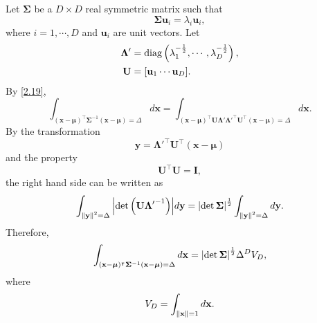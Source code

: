 \subsection{}
\label{2.23}
Let $\bm{\Sigma}$ be a $D \times D$ real symmetric matrix such that
%
\begin{equation}
\bm{\Sigma} 
\mathbf{u}_i 
= 
\lambda_i 
\mathbf{u}_i,
\end{equation}
%
where $i = 1, \cdots, D$ and $\mathbf{u}_i$ are unit vectors.
Let 
%
\begin{equation}
\begin{aligned}
\bm{\Lambda}'
&= 
\operatorname{diag} 
\left( 
	\lambda_1 ^ {- \frac{1}{2}}, 
	\cdots, 
	\lambda_D ^ {- \frac{1}{2}} 
\right), 
\\
\mathbf{U} 
&= 
[\mathbf{u}_1 \cdots \mathbf{u}_D].
\end{aligned}
\end{equation}
%
By \ref{2.19}, 
%
\begin{equation}
\int_
{
(\mathbf{x} - \bm{\mu}) ^ \intercal 
\bm{\Sigma} ^ {- 1} 
(\mathbf{x} - \bm{\mu}) 
= 
\Delta
} 
d\mathbf{x} 
= 
\int_
{
(\mathbf{x} - \bm{\mu}) ^ \intercal 
\mathbf{U} 
\bm{\Lambda}' 
{\bm{\Lambda}'} ^ \intercal 
\mathbf{U} ^ \intercal  
(\mathbf{x} - \bm{\mu}) 
= 
\Delta} 
d\mathbf{x}.
\end{equation}
%
By the transformation
%
\begin{equation}
\mathbf{y}
= 
{\bm{\Lambda}'} ^ \intercal 
\mathbf{U} ^ \intercal  
(\mathbf{x} - \bm{\mu})
\end{equation}
%
and the property
%
\begin{equation}
\mathbf{U} ^ \intercal 
\mathbf{U} 
= 
\mathbf{I},
\end{equation}
%
the right hand side can be written as
%
\begin{equation}
\int_
{\norm{\mathbf{y}} ^ 2 = \Delta} 
\abs
{
\det 
\left( 
	\mathbf{U} 
	{\mathbf{\Lambda}'} ^ {- 1} 
\right)
} 
d\mathbf{y}
= 
\abs{\det \mathbf{\Sigma}} ^ \frac{1}{2} 
\int_{\norm{\mathbf{y}} ^ 2 
= 
\Delta} 
d\mathbf{y}.
\end{equation}
%
Therefore,
%
\begin{equation}
\int_
{
(\mathbf{x} - \bm{\mu}) ^ \intercal 
\bm{\Sigma} ^ {- 1}  
(\mathbf{x} - \bm{\mu}) 
= 
\Delta
} 
d\mathbf{x}
= 
\abs{\det \mathbf{\Sigma}} ^ \frac{1}{2} 
\Delta ^ D 
V_D,
\end{equation}
%
where
%
\begin{equation}
V_D
= 
\int_{\norm{\mathbf{x}} = 1} 
d\mathbf{x}.
\end{equation}
%


